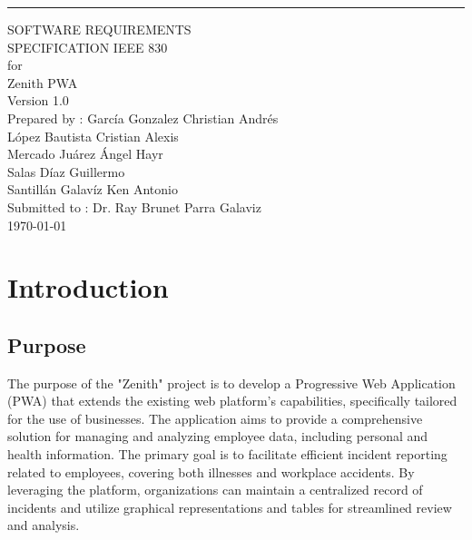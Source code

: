 \documentclass{scrreprt}
\date{}
\def\myversion{1.0 }
\begin{document}
\begin{flushright}
    \rule{16cm}{5pt}\vskip1cm
    \begin{bfseries}
        \Huge{SOFTWARE REQUIREMENTS\\ SPECIFICATION IEEE 830}\\
        \vspace{1.5cm}
        for\\
        \vspace{1.5cm}
        Zenith PWA\\
        \LARGE{Version \myversion}\\
        \vspace{1.5cm}
        Prepared by : García Gonzalez Christian Andrés\\
        López Bautista Cristian Alexis\\
        Mercado Juárez Ángel Hayr\\
        Salas Díaz Guillermo\\
        Santillán Galavíz Ken Antonio\\
        \vspace{1.5cm}
        Submitted to : Dr. Ray Brunet Parra Galaviz \\
        \vspace{1.5cm}
        \today\\
    \end{bfseries}
\end{flushright}

\tableofcontents

\chapter{Introduction}

\section{Purpose}
The purpose of the "Zenith" project is to develop a Progressive Web Application (PWA) that extends the existing web platform's capabilities, specifically tailored for the use of businesses. The application aims to provide a comprehensive solution for managing and analyzing employee data, including personal and health information. The primary goal is to facilitate efficient incident reporting related to employees, covering both illnesses and workplace accidents. By leveraging the platform, organizations can maintain a centralized record of incidents and utilize graphical representations and tables for streamlined review and analysis.
\end{document}
